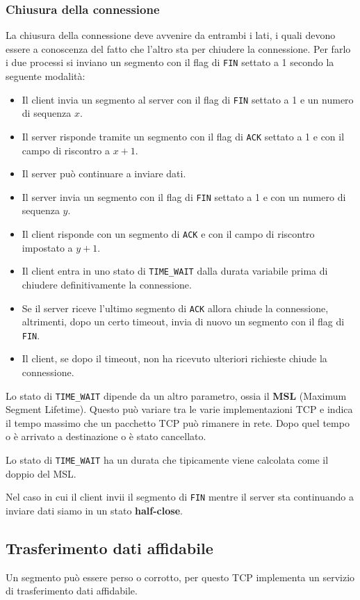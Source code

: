 \subsubsection{Chiusura della connessione}
La chiusura della connessione deve avvenire da entrambi i lati, i quali
devono essere a conoscenza del fatto che l'altro sta per chiudere la 
connessione. Per farlo i due processi si inviano un segmento con il 
flag di \verb|FIN| settato a 1 secondo la seguente modalità:
\begin{itemize}
	\item Il client invia un segmento al server con il flag di 
		\verb|FIN| settato a 1 e un numero di sequenza $x$.
	\item Il server risponde tramite un segmento con il flag di 
		\verb|ACK| settato a 1 e con il campo di riscontro a $x+1$.
	\item Il server può continuare a inviare dati.
	\item Il server invia un segmento con il flag di \verb|FIN| settato
		a 1 e con un numero di sequenza $y$.
	\item Il client risponde con un segmento di \verb|ACK| e con il 
		campo di riscontro impostato a $y+1$.
	\item Il client entra in uno stato di \verb|TIME_WAIT| dalla durata
		variabile prima di chiudere definitivamente la connessione.
	\item Se il server riceve l'ultimo segmento di \verb|ACK| allora 
		chiude la connessione, altrimenti, dopo un certo timeout, invia
		di nuovo un segmento con il flag di \verb|FIN|.
	\item Il client, se dopo il timeout, non ha ricevuto ulteriori 
		richieste chiude la connessione.
\end{itemize}
Lo stato di \verb|TIME_WAIT| dipende da un altro parametro, ossia il 
\textbf{MSL} (Maximum Segment Lifetime). Questo può variare tra le 
varie implementazioni TCP e indica il tempo massimo che un pacchetto 
TCP può rimanere in rete. Dopo quel tempo o è arrivato a destinazione o
è stato cancellato.

Lo stato di \verb|TIME_WAIT| ha un durata che tipicamente viene 
calcolata come il doppio del MSL.

Nel caso in cui il client invii il segmento di \verb|FIN| mentre il 
server sta continuando a inviare dati siamo in un stato 
\textbf{half-close}.

\subsection{Trasferimento dati affidabile}
Un segmento può essere perso o corrotto, per questo TCP implementa un
servizio di trasferimento dati affidabile.

